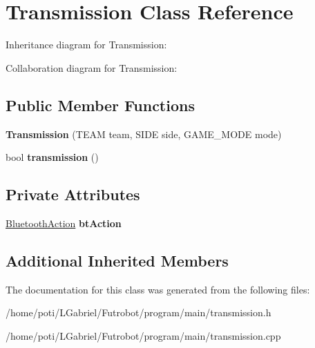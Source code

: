 \hypertarget{classTransmission}{}\section{Transmission Class Reference}
\label{classTransmission}


Inheritance diagram for Transmission\+:


Collaboration diagram for Transmission\+:
\subsection*{Public Member Functions}
\begin{DoxyCompactItemize}
\item 
{\bfseries Transmission} (T\+E\+AM team, S\+I\+DE side, G\+A\+M\+E\+\_\+\+M\+O\+DE mode)\hypertarget{classTransmission_a85b08870e456997c7df282096c0feb2d}{}\label{classTransmission_a85b08870e456997c7df282096c0feb2d}

\item 
bool {\bfseries transmission} ()\hypertarget{classTransmission_ae7eb0927c75cfd77f9d0433237409130}{}\label{classTransmission_ae7eb0927c75cfd77f9d0433237409130}

\end{DoxyCompactItemize}
\subsection*{Private Attributes}
\begin{DoxyCompactItemize}
\item 
\hyperlink{classBluetoothAction}{Bluetooth\+Action} {\bfseries bt\+Action}\hypertarget{classTransmission_a258b29d541d437871211159c33e95be0}{}\label{classTransmission_a258b29d541d437871211159c33e95be0}

\end{DoxyCompactItemize}
\subsection*{Additional Inherited Members}


The documentation for this class was generated from the following files\+:\begin{DoxyCompactItemize}
\item 
/home/poti/\+L\+Gabriel/\+Futrobot/program/main/transmission.\+h\item 
/home/poti/\+L\+Gabriel/\+Futrobot/program/main/transmission.\+cpp\end{DoxyCompactItemize}
